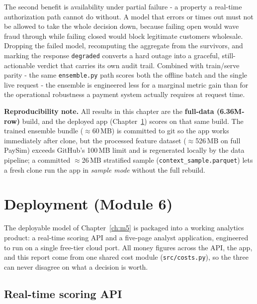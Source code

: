 \documentclass[11pt,a4paper]{report}
\newcommand{\code}[1]{\texttt{\small #1}}
\begin{document}
The second benefit is availability under partial failure - a property a real-time authorization path cannot do without. A model that errors or times out must not be allowed to take the whole decision down, because failing open would wave fraud through while failing closed would block legitimate customers wholesale. Dropping the failed model, recomputing the aggregate from the survivors, and marking the response \code{degraded} converts a hard outage into a graceful, still-actionable verdict that carries its own audit trail. Combined with train/serve parity - the same \code{ensemble.py} path scores both the offline batch and the single live request - the ensemble is engineered less for a marginal metric gain than for the operational robustness a payment system actually requires at request time.

\begin{keybox}
\textbf{Reproducibility note.} All results in this chapter are the \textbf{full-data
(6.36M-row)} build, and the deployed app (Chapter~\ref{ch:m6}) scores on that same build.
The trained ensemble bundle ($\approx$60\,MB) is committed to git so the app works
immediately after clone, but the processed feature dataset ($\approx$526\,MB on full PaySim)
exceeds GitHub's 100\,MB limit and is regenerated locally by the data pipeline; a committed
$\approx$26\,MB stratified sample (\code{context\_sample.parquet}) lets a fresh clone run the
app in \emph{sample mode} without the full rebuild.
\end{keybox}

\chapter{Deployment (Module 6)}
\label{ch:m6}

The deployable model of Chapter~\ref{ch:m5} is packaged into a working analytics product:
a real-time scoring API and a five-page analyst application, engineered to run on a single
free-tier cloud port. All money figures across the API, the app, and this report come from
one shared cost module (\code{src/costs.py}), so the three can never disagree on what a
decision is worth.

\section{Real-time scoring API}
\end{document}
